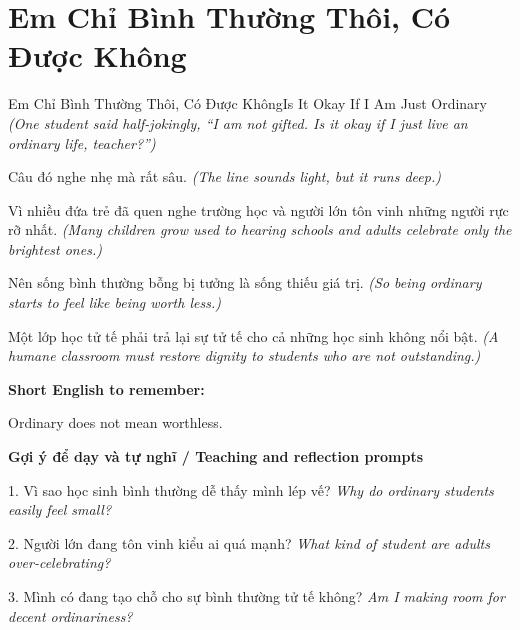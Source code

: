 \section{Em Chỉ Bình Thường Thôi, Có Được Không}
\begin{truyen}{Em Chỉ Bình Thường Thôi, Có Được Không}{Is It Okay If I Am Just Ordinary}
\textit{(One student said half-jokingly, “I am not gifted. Is it okay if I just live an ordinary life, teacher?”)}

Câu đó nghe nhẹ mà rất sâu.
\textit{(The line sounds light, but it runs deep.)}

Vì nhiều đứa trẻ đã quen nghe trường học và người lớn tôn vinh những người rực rỡ nhất.
\textit{(Many children grow used to hearing schools and adults celebrate only the brightest ones.)}

Nên sống bình thường bỗng bị tưởng là sống thiếu giá trị.
\textit{(So being ordinary starts to feel like being worth less.)}

\end{truyen}

\begin{baihoc}
Một lớp học tử tế phải trả lại sự tử tế cho cả những học sinh không nổi bật.
\textit{(A humane classroom must restore dignity to students who are not outstanding.)}
\end{baihoc}

\begin{ghinhoanh}
\textbf{Short English to remember:}

Ordinary does not mean worthless.

\end{ghinhoanh}

\begin{tuhocnhanh}
\textbf{Gợi ý để dạy và tự nghĩ / Teaching and reflection prompts}

1. Vì sao học sinh bình thường dễ thấy mình lép vế? \textit{Why do ordinary students easily feel small?}

2. Người lớn đang tôn vinh kiểu ai quá mạnh? \textit{What kind of student are adults over-celebrating?}

3. Mình có đang tạo chỗ cho sự bình thường tử tế không? \textit{Am I making room for decent ordinariness?}
\end{tuhocnhanh}
\ngancach

